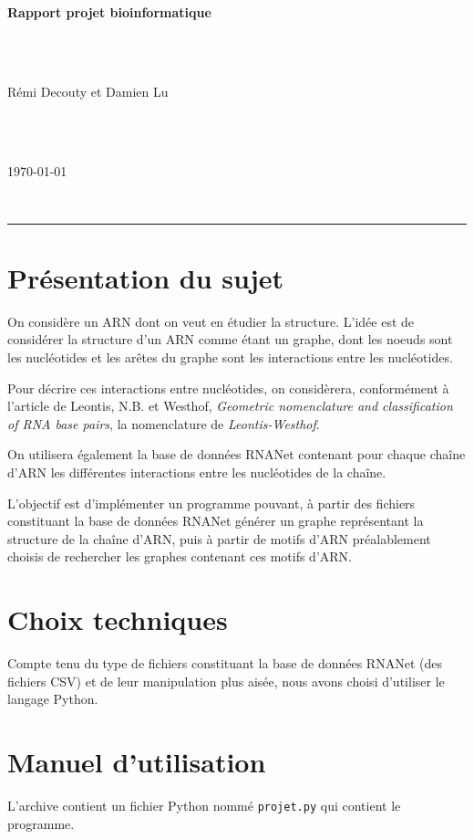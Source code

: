 \documentclass[11pt,a4paper]{article}
\begin{document}
\begin{huge}
\noindent \textbf{Rapport projet bioinformatique}
\end{huge} 
\\ \\
\begin{Large}
Rémi Decouty et Damien Lu
\end{Large} \\ \\
\begin{Large}
\today
\end{Large}
~\\
\hrule 
{}
\section{Présentation du sujet}
On considère un ARN dont on veut en étudier la structure. L'idée est de considérer la structure d'un ARN comme étant un graphe, dont les noeuds sont les nucléotides et les arêtes du graphe sont les interactions entre les nucléotides. 

Pour décrire ces interactions entre nucléotides, on considèrera, conformément à l'article de Leontis, N.B. et Westhof, \textit{Geometric nomenclature and classification of RNA base pairs}, la nomenclature de \textit{Leontis-Westhof}.

On utilisera également la base de données RNANet contenant pour chaque chaîne d'ARN les différentes interactions entre les nucléotides de la chaîne. 

L'objectif est d'implémenter un programme pouvant, à partir des fichiers constituant la base de données RNANet générer un graphe représentant la structure de la chaîne d'ARN, puis à partir de motifs d'ARN préalablement choisis de rechercher les graphes contenant ces motifs d'ARN.
\section{Choix techniques}
Compte tenu du type de fichiers constituant la base de données RNANet (des fichiers CSV) et de leur manipulation plus aisée, nous avons choisi d'utiliser le langage Python. 
\section{Manuel d'utilisation}
L'archive contient un fichier Python nommé \texttt{projet.py} qui contient le programme.
\end{document}
